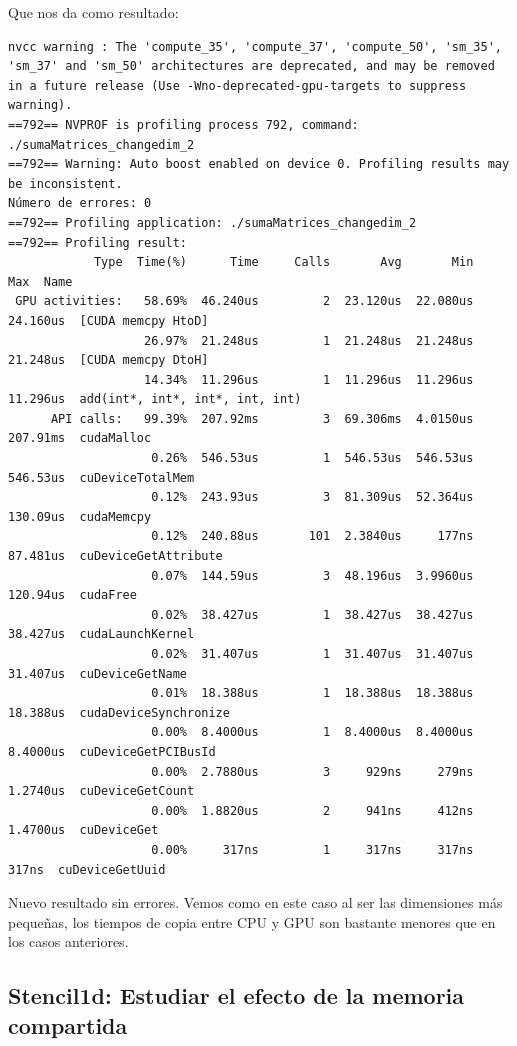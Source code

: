 \documentclass[11pt]{article}
\theoremstyle{plain}
\begin{document}
Que nos da como resultado:
\begin{verbatim}
nvcc warning : The 'compute_35', 'compute_37', 'compute_50', 'sm_35', 'sm_37' and 'sm_50' architectures are deprecated, and may be removed in a future release (Use -Wno-deprecated-gpu-targets to suppress warning).
==792== NVPROF is profiling process 792, command: ./sumaMatrices_changedim_2
==792== Warning: Auto boost enabled on device 0. Profiling results may be inconsistent.
Número de errores: 0
==792== Profiling application: ./sumaMatrices_changedim_2
==792== Profiling result:
            Type  Time(%)      Time     Calls       Avg       Min       Max  Name
 GPU activities:   58.69%  46.240us         2  23.120us  22.080us  24.160us  [CUDA memcpy HtoD]
                   26.97%  21.248us         1  21.248us  21.248us  21.248us  [CUDA memcpy DtoH]
                   14.34%  11.296us         1  11.296us  11.296us  11.296us  add(int*, int*, int*, int, int)
      API calls:   99.39%  207.92ms         3  69.306ms  4.0150us  207.91ms  cudaMalloc
                    0.26%  546.53us         1  546.53us  546.53us  546.53us  cuDeviceTotalMem
                    0.12%  243.93us         3  81.309us  52.364us  130.09us  cudaMemcpy
                    0.12%  240.88us       101  2.3840us     177ns  87.481us  cuDeviceGetAttribute
                    0.07%  144.59us         3  48.196us  3.9960us  120.94us  cudaFree
                    0.02%  38.427us         1  38.427us  38.427us  38.427us  cudaLaunchKernel
                    0.02%  31.407us         1  31.407us  31.407us  31.407us  cuDeviceGetName
                    0.01%  18.388us         1  18.388us  18.388us  18.388us  cudaDeviceSynchronize
                    0.00%  8.4000us         1  8.4000us  8.4000us  8.4000us  cuDeviceGetPCIBusId
                    0.00%  2.7880us         3     929ns     279ns  1.2740us  cuDeviceGetCount
                    0.00%  1.8820us         2     941ns     412ns  1.4700us  cuDeviceGet
                    0.00%     317ns         1     317ns     317ns     317ns  cuDeviceGetUuid
\end{verbatim}

Nuevo resultado sin errores. Vemos como en este caso al ser las dimensiones más pequeñas, los tiempos de copia entre CPU y GPU son bastante menores que en los casos anteriores.

\subsection{Stencil1d: Estudiar el efecto de la memoria compartida}
\end{document}

